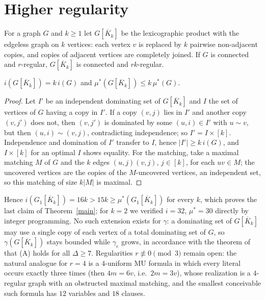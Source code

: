 \documentclass[11pt]{article}
\theoremstyle{remark}\newtheorem{remark}[theorem]{Remark}
\begin{document}
\section{Higher regularity}
For a graph $G$ and $k\ge1$ let $G[\overline K_k]$ be the lexicographic product with the edgeless graph on $k$ vertices: each vertex $v$ is replaced by $k$ pairwise non-adjacent copies, and copies of adjacent vertices are completely joined. If $G$ is connected and $r$-regular, $G[\overline K_k]$ is connected and $rk$-regular.
\begin{lemma}
$i(G[\overline K_k])=k\,i(G)$ and $\mu^*(G[\overline K_k])\le k\,\mu^*(G)$.
\end{lemma}
\begin{proof}
Let $I'$ be an independent dominating set of $G[\overline K_k]$ and $I$ the set of vertices of $G$ having a copy in $I'$. If a copy $(v,j)$ lies in $I'$ and another copy $(v,j')$ does not, then $(v,j')$ is dominated by some $(u,i)\in I'$ with $u\sim v$, but then $(u,i)\sim(v,j)$, contradicting independence; so $I'=I\times[k]$. Independence and domination of $I'$ transfer to $I$, hence $|I'|\ge k\,i(G)$, and $I\times[k]$ for an optimal $I$ shows equality. For the matching, take a maximal matching $M$ of $G$ and the $k$ edges $(u,j)(v,j)$, $j\in[k]$, for each $uv\in M$; the uncovered vertices are the copies of the $M$-uncovered vertices, an independent set, so this matching of size $k|M|$ is maximal.
\end{proof}
Hence $i(G_1[\overline K_k])=16k>15k\ge\mu^*(G_1[\overline K_k])$ for every $k$, which proves the last claim of Theorem~\ref{main}; for $k=2$ we verified $i=32$, $\mu^*=30$ directly by integer programming. No such extension exists for $\gamma$: a dominating set of $G[\overline K_k]$ may use a single copy of each vertex of a total dominating set of $G$, so $\gamma(G[\overline K_k])$ stays bounded while $\gamma_e$ grows, in accordance with the theorem of~\cite{Gupta} that (A) holds for all $\Delta\ge7$. Regularities $r\not\equiv0\pmod 3$ remain open: the natural analogue for $r=4$ is a $4$-uniform MU formula in which every literal occurs exactly three times (then $4m=6v$, i.e.\ $2m=3v$), whose realization is a $4$-regular graph with an obstructed maximal matching, and the smallest conceivable such formula has $12$ variables and $18$ clauses.
\end{document}
